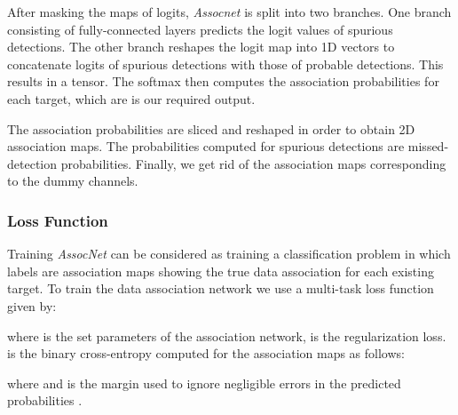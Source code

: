 \documentclass[letterpaper, 10 pt, conference]{ieeeconf}
\begin{document}
\par After masking the maps of logits, \textit{Assocnet} is split into two branches. One branch consisting of fully-connected layers predicts the  logit values of spurious detections. The other branch reshapes the logit map into 1D vectors to concatenate logits of spurious detections with those of probable detections. This results in a  tensor. The softmax then computes the association probabilities for each target, which are is our required output.
\par The association probabilities are sliced and reshaped in order to obtain 2D association maps. The probabilities computed for spurious detections are missed-detection probabilities. Finally, we get rid of the association maps  corresponding to the  dummy channels.

\subsubsection{Loss Function}
Training \textit{AssocNet} can be considered as training a classification problem in which labels are association maps showing the true data association for each existing target. To train the data association network we use a multi-task loss function given by:



\noindent
where  is the set parameters of the association network,  is the regularization loss.  is the binary cross-entropy computed for the association maps as follows:


\noindent
where  and  is the margin used to ignore negligible  errors  in the predicted probabilities .

\begin{algorithm}[ht]
\SetAlgoLined
\end{algorithm}
\end{document}
